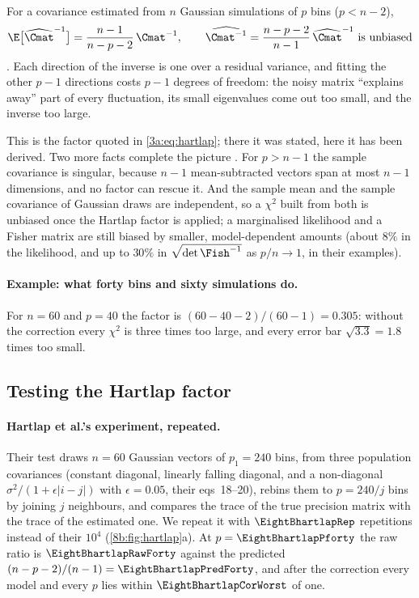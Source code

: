 \begin{keyidea}
For a covariance estimated from $n$ Gaussian simulations of $p$ bins ($p<n-2$),
\[
  \E\bigl[\widehat\Cmat^{-1}\bigr]=\frac{n-1}{n-p-2}\,\Cmat^{-1},\qquad
  \widehat{\Cmat^{-1}}=\frac{n-p-2}{n-1}\,\widehat\Cmat^{-1}\ \text{is unbiased}
\]
\cite[eq.~17]{Hartlap2007}. Each direction of the inverse is one over a residual variance, and fitting
the other $p-1$ directions costs $p-1$ degrees of freedom: the noisy matrix ``explains away'' part of
every fluctuation, its small eigenvalues come out too small, and the inverse too large.
\end{keyidea}

This is the factor quoted in \eqref{3a:eq:hartlap}; there it was stated, here it has been derived.
Two more facts complete the picture \cite[§§2.2, 4]{Hartlap2007}. For $p>n-1$ the sample covariance is
singular, because $n-1$ mean-subtracted vectors span at most $n-1$ dimensions, and no factor can
rescue it. And the sample mean and the sample covariance of Gaussian draws are independent, so a
$\chi^2$ built from both is unbiased once the Hartlap factor is applied; a marginalised likelihood and a
Fisher matrix are still biased by smaller, model-dependent amounts (about $8\%$ in the likelihood, and
up to $30\%$ in $\sqrt{\det\Fish^{-1}}$ as $p/n\to1$, in their examples).

\paragraph{Example: what forty bins and sixty simulations do.}
For $n=60$ and $p=40$ the factor is $(60-40-2)/(60-1)=0.305$: without the correction every $\chi^2$ is three
times too large, and every error bar $\sqrt{3.3}=1.8$ times too small.

\subsection{Testing the Hartlap factor}
\label{8b:sec:hartlap-test}

\paragraph{Hartlap et al.'s experiment, repeated.}
Their test \cite[§3.2, Fig.~1]{Hartlap2007} draws $n=60$ Gaussian vectors of $p_1=240$ bins, from three
population covariances (constant diagonal, linearly falling diagonal, and a non-diagonal
$\sigma^2/(1+\epsilon|i-j|)$ with $\epsilon=0.05$, their eqs~18--20), rebins them to $p=240/j$ bins by joining $j$
neighbours, and compares the trace of the true precision matrix with the trace of the estimated one. We
repeat it with $\EightBhartlapRep$ repetitions instead of their $10^4$ (\cref{8b:fig:hartlap}a). At $p=\EightBhartlapPforty$ the
raw ratio is $\EightBhartlapRawForty$ against the predicted $(n-p-2)/(n-1)=\EightBhartlapPredForty$, and after the correction every
model and every $p$ lies within $\EightBhartlapCorWorst$ of one.

